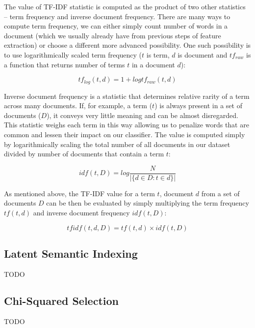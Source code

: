 The value of TF-IDF statistic is computed as the product of two other statistics -- term frequency and inverse document frequency. There are many ways to compute term frequency, we can either simply count number of words in a document (which we usually already have from previous steps of feature extraction) or choose a different more advanced possibility. One such possibility is to use logarithmically scaled term frequency ($t$ is term, $d$ is document and $tf_{raw}$ is a function that returns number of terms $t$ in a document $d$):

$$tf_{log}(t,d) = 1 + log tf_{raw}(t,d)$$

Inverse document frequency is a statistic that determines relative rarity of a term across many documents. If, for example, a term ($t$) is always present in a set of documents ($D$), it conveys very little meaning and can be almost disregarded. This statistic weighs each term in this way allowing us to penalize words that are common and lessen their impact on our classifier. The value is computed simply by logarithmically scaling the total number of all documents in our dataset divided by number of documents that contain a term $t$:

$$idf(t, D) = log \frac{N}{|\{d \in D : t \in d\}|}$$

As mentioned above, the TF-IDF value for a term $t$, document $d$ from a set of documents $D$ can be then be evaluated by simply multiplying the term frequency $tf(t,d)$ and inverse document frequency $idf(t,D)$:

$$tfidf(t,d,D) = tf(t,d) \times idf(t,D)$$

\subsection{Latent Semantic Indexing}

TODO

\subsection{Chi-Squared Selection}

TODO